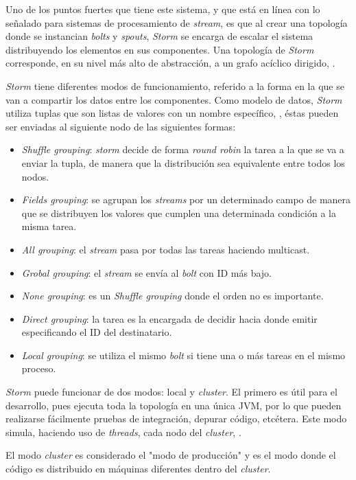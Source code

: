 Uno de los puntos fuertes que tiene este sistema, y que está en línea con lo señalado para sistemas de procesamiento de \textit{stream}, es que al crear una topología donde se instancian \textit{bolts} y \textit{spouts}, \textit{Storm} se encarga de escalar el sistema distribuyendo los elementos en sus componentes. Una topología de \textit{Storm} corresponde, en su nivel más alto de abstracción, a un grafo acíclico dirigido, \cite{Storm}.

\textit{Storm} tiene diferentes modos de funcionamiento, referido a la forma en la que se van a compartir los datos entre los componentes. Como modelo de datos, \textit{Storm} utiliza tuplas que son listas de valores con un nombre específico, \cite{Storm}, éstas pueden ser enviadas al siguiente nodo de las siguientes formas:

\begin{itemize}
\item \textit{Shuffle grouping}: \textit{storm} decide de forma \textit{round robin} la tarea a la que se va a enviar la tupla, de manera que la distribución sea equivalente entre todos los nodos.
\item \textit{Fields grouping}: se agrupan los \textit{streams} por un determinado campo de manera que se distribuyen los valores que cumplen una determinada condición a la misma tarea.
\item \textit{All grouping}: el \textit{stream} pasa por todas las tareas haciendo multicast.
\item \textit{Grobal grouping}: el \textit{stream} se envía al \textit{bolt} con ID más bajo.
\item \textit{None grouping}: es un \textit{Shuffle grouping} donde el orden no es importante.
\item \textit{Direct grouping}: la tarea es la encargada de decidir hacia donde emitir especificando el ID del destinatario.
\item \textit{Local grouping}: se utiliza el mismo \textit{bolt} si tiene una o más tareas en el mismo proceso.
\end{itemize}

\textit{Storm} puede funcionar de dos modos: local y \textit{cluster}. El primero es útil para el desarrollo, pues ejecuta toda la topología en una única JVM, por lo que pueden realizarse fácilmente pruebas de integración, depurar código, etcétera. Este modo simula, haciendo uso de \textit{threads}, cada nodo del \textit{cluster}, \cite{Storm}.

El modo \textit{cluster} es considerado el "modo de producción" y es el modo donde el código es distribuido en máquinas diferentes dentro del \textit{cluster}.

